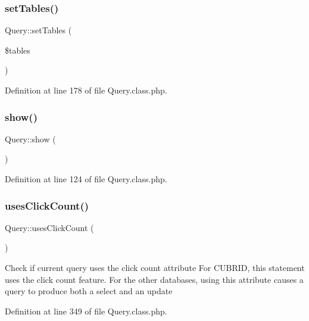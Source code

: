\subsubsection{\texorpdfstring{set\+Tables()}{setTables()}}
{\footnotesize\ttfamily Query\+::set\+Tables (\begin{DoxyParamCaption}\item[{}]{\$tables }\end{DoxyParamCaption})}



Definition at line 178 of file Query.\+class.\+php.

\hypertarget{classQuery_ab191941325776f3475aeea910167a116}{}\label{classQuery_ab191941325776f3475aeea910167a116} 
\subsubsection{\texorpdfstring{show()}{show()}}
{\footnotesize\ttfamily Query\+::show (\begin{DoxyParamCaption}{ }\end{DoxyParamCaption})}



Definition at line 124 of file Query.\+class.\+php.

\hypertarget{classQuery_ab0f5afff51d19f0f5478055dcb16c2c0}{}\label{classQuery_ab0f5afff51d19f0f5478055dcb16c2c0} 
\subsubsection{\texorpdfstring{uses\+Click\+Count()}{usesClickCount()}}
{\footnotesize\ttfamily Query\+::uses\+Click\+Count (\begin{DoxyParamCaption}{ }\end{DoxyParamCaption})}

Check if current query uses the click count attribute For C\+U\+B\+R\+ID, this statement uses the click count feature. For the other databases, using this attribute causes a query to produce both a select and an update 

Definition at line 349 of file Query.\+class.\+php.

\hypertarget{classQuery_a0ed9a48e6619d83211d0b81907fa8d6b}{}\label{classQuery_a0ed9a48e6619d83211d0b81907fa8d6b} 
